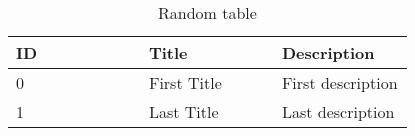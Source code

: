 \vspace{0.3cm}
\begin{table}[h]
    \centering
    \begin{tabular}{ | p{0.33\linewidth} | p{0.33\linewidth} | p{0.33\linewidth} | }
        \hline
        ID & Title & Description \\
        \hline
        0 & First Title & First description \\
        1 & Last Title & Last description \\
        \hline
    \end{tabular}
    \caption{Random table}
    \label{tab:random_table}
\end{table}
\vspace{0.3cm}